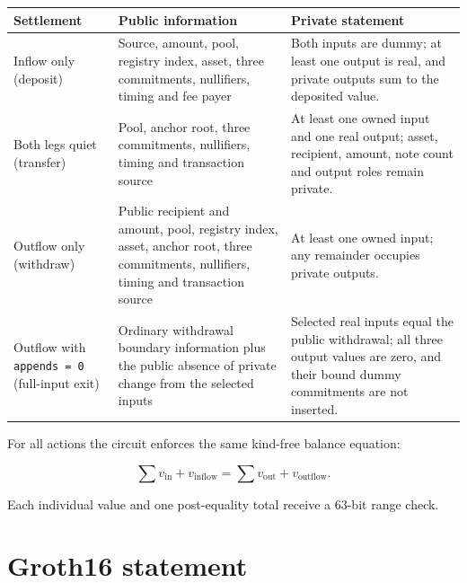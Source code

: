 \documentclass[11pt,letterpaper]{article}
\begin{document}
{\def\LTcaptype{none} %
\begin{longtable}[]{@{}
  >{\raggedright\arraybackslash}p{}
  >{\raggedright\arraybackslash}p{}
  >{\raggedright\arraybackslash}p{}@{}}
\toprule\noalign{}
\begin{minipage}[b]{\linewidth}\raggedright
Settlement
\end{minipage} & \begin{minipage}[b]{\linewidth}\raggedright
Public information
\end{minipage} & \begin{minipage}[b]{\linewidth}\raggedright
Private statement
\end{minipage} \\
\midrule\noalign{}
\endhead
\bottomrule\noalign{}
\endlastfoot
Inflow only (deposit) & Source, amount, pool, registry index, asset,
three commitments, nullifiers, timing and fee payer & Both inputs are
dummy; at least one output is real, and private outputs sum to the
deposited value. \\
Both legs quiet (transfer) & Pool, anchor root, three commitments,
nullifiers, timing and transaction source & At least one owned input and
one real output; asset, recipient, amount, note count and output roles
remain private. \\
Outflow only (withdraw) & Public recipient and amount, pool, registry
index, asset, anchor root, three commitments, nullifiers, timing and
transaction source & At least one owned input; any remainder occupies
private outputs. \\
Outflow with \texttt{appends\ =\ 0} (full-input exit) & Ordinary
withdrawal boundary information plus the public absence of private
change from the selected inputs & Selected real inputs equal the public
withdrawal; all three output values are zero, and their bound dummy
commitments are not inserted. \\
\end{longtable}
}

For all actions the circuit enforces the same kind-free balance
equation:

\[\sum v_{\mathrm{in}} + v_{\mathrm{inflow}} = \sum v_{\mathrm{out}} + v_{\mathrm{outflow}}.\]

Each individual value and one post-equality total receive a 63-bit range
check.

\section{Groth16 statement}\label{groth16-statement}
\end{document}
